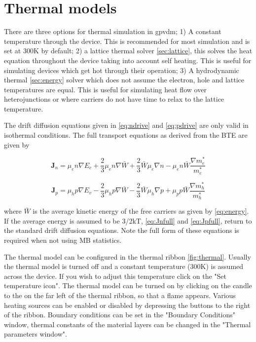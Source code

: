 \section{Thermal models}
There are three options for thermal simulation in gpvdm; 1) A constant temperature through the device. This is recommended for most simulation and is set at 300K by default; 2) a lattice thermal solver \ref{sec:lattice}, this solves the heat equation throughout the device taking into account self heating.  This is useful for simulating devices which get hot through their operation; 3) A hydrodynamic thermal \ref{sec:energy} solver which does not assume the electron, hole and lattice temperatures are equal.  This is useful for simulating heat flow over heterojunctions or where carriers do not have time to relax to the lattice temperature.

The drift diffusion equations given in \ref{eq:ndrive} and \ref{eq:pdrive} are only valid in isothermal conditions.  The full transport equations as derived from the BTE \cite{Azoff} are given by

\begin{equation}
\label{eq:Jnfull}
 \textbf{J}_n = \mu_e n \nabla E_c +\frac{2}{3} \mu_e n \nabla \bar{W} + \frac{2}{3} \bar{W} \mu_e \nabla n - \mu_e n \bar{W} \frac{\nabla m^*_e}{m^*_e}
\end{equation}


\begin{equation}
\label{eq:Jpfull}
 \textbf{J}_p = \mu_h p \nabla E_v -\frac{2}{3} \mu_h p \nabla \bar{W} - \frac{2}{3} \bar{W} \mu_h \nabla p + \mu_p p \bar{W} \frac{\nabla m^*_h}{m^*_h}
\end{equation}

where $\bar{W}$ is the average kinetic energy of the free carriers as given by \ref{eq:energy}.  If the average energy is assumed to be 3/2kT, \ref{eq:Jnfull} and \ref{eq:Jpfull}, return to the standard drift diffusion equations. Note the full form of these equations is required when not using MB statistics.

The thermal model can be configured in the thermal ribbon \ref{fig:thermal}. Usually the thermal model is turned off and a constant temperature (300K) is assumed across the device. If you wish to adjust this temperature click on the "Set temperature icon".  The thermal model can be turned on by clicking on the candle to the on the far left of the thermal ribbon, so that a flame appears.  Various heating sources can be enabled or disabled by depressing the buttons to the right of the ribbon. Boundary conditions can be set in the "Boundary Conditions" window, thermal constants of the material layers can be changed in the "Thermal parameters window".


